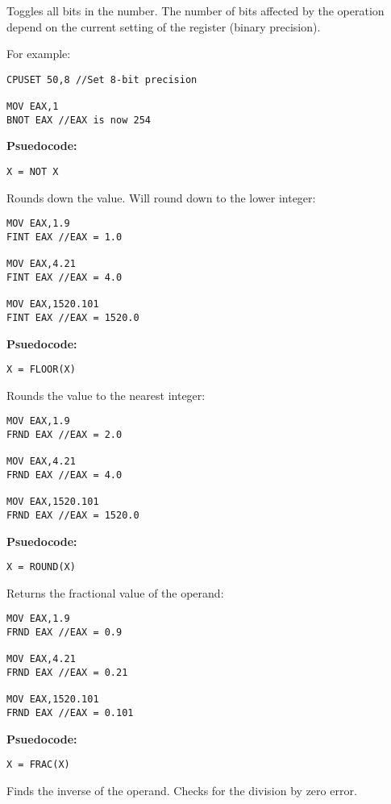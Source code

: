 Toggles all bits in the number. The number of bits affected by the operation depend on the current setting of the  register (binary precision).

For example:
\begin{verbatim}
CPUSET 50,8 //Set 8-bit precision

MOV EAX,1
BNOT EAX //EAX is now 254
\end{verbatim}

\textbf{Psuedocode:}
\begin{verbatim}
X = NOT X
\end{verbatim}


Rounds down the value. Will round down to the lower integer:
\begin{verbatim}
MOV EAX,1.9
FINT EAX //EAX = 1.0

MOV EAX,4.21
FINT EAX //EAX = 4.0

MOV EAX,1520.101
FINT EAX //EAX = 1520.0
\end{verbatim}

\textbf{Psuedocode:}
\begin{verbatim}
X = FLOOR(X)
\end{verbatim}


Rounds the value to the nearest integer:
\begin{verbatim}
MOV EAX,1.9
FRND EAX //EAX = 2.0

MOV EAX,4.21
FRND EAX //EAX = 4.0

MOV EAX,1520.101
FRND EAX //EAX = 1520.0
\end{verbatim}

\textbf{Psuedocode:}
\begin{verbatim}
X = ROUND(X)
\end{verbatim}


Returns the fractional value of the operand:
\begin{verbatim}
MOV EAX,1.9
FRND EAX //EAX = 0.9

MOV EAX,4.21
FRND EAX //EAX = 0.21

MOV EAX,1520.101
FRND EAX //EAX = 0.101
\end{verbatim}

\textbf{Psuedocode:}
\begin{verbatim}
X = FRAC(X)
\end{verbatim}


Finds the inverse of the operand. Checks for the division by zero error.

